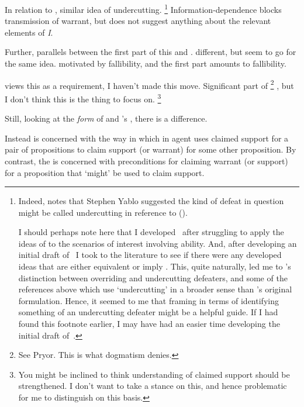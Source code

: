 \begin{note}
  In relation to \nI{}, similar idea of undercutting.\nolinebreak
  \footnote{
    Indeed, \citeauthor{Wright:1991vn} notes that Stephen Yablo suggested the kind of defeat in question might be called undercutting in reference to \citeauthor{Pollock:1987un} (\Citeyear[95,fn.9]{Wright:1991vn}).

    I should perhaps note here that I developed~\nI{} after struggling to apply the ideas of \citeauthor{Wright:2011wn} to the scenarios of interest involving ability.
    And, after developing an initial draft of~\nI{} I took to the literature to see if there were any developed ideas that are either equivalent or imply \nI{}.
    This, quite naturally, led me to \citeauthor{Pollock:1987un}'s distinction between overriding and undercutting defeaters, and some of the references above which use `undercutting' in a broader sense than \citeauthor{Pollock:1987un}'s original formulation.
    Hence, it seemed to me that framing \nI{} in terms of identifying something of an undercutting defeater might be a helpful guide.
    If I had found this footnote earlier, I may have had an easier time developing the initial draft of~\nI{}.
  }
  {
    \color{expand}
    Information-dependence blocks transmission of warrant, but does not suggest anything about the relevant elements of \emph{I}.
  }

  Further, parallels between the first part of this and \eiS{}.
  different, but seem to go for the same idea.
  \eiS{} motivated by fallibility, and the first part amounts to fallibility.

  \citeauthor{Wright:2000tq} views this as a requirement, I haven't made this move.
  Significant part of \citeauthor{Wright:2000tq}\nolinebreak
  \footnote{
    See Pryor.
    This is what dogmatism denies.
  }
  , but I don't think this is the thing to focus on.\nolinebreak
  \footnote{
    You might be inclined to think understanding of claimed support should be strengthened.
    I don't want to take a stance on this, and hence problematic for me to distinguish on this basis.
  }

  {%
    Still, looking at the \emph{form} of \nI{} and \citeauthor{Wright:2000tq}'s \widt{}, there is a difference.
  }

  Instead
  \nI{} is concerned with the way in which in agent uses claimed support for a pair of propositions to claim support (or warrant) for some other proposition.
  By contrast, the \widt{} is concerned with preconditions for claiming warrant (or support) for a proposition that `might' be used to claim support.


\end{note}
